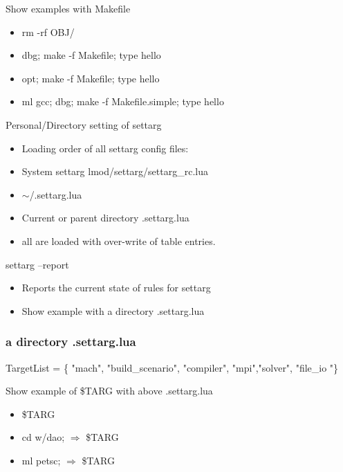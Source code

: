 \documentclass{beamer}
\begin{document}
\begin{frame}{Show examples with Makefile }
  \begin{itemize}
    \item rm -rf OBJ/
    \item dbg; make -f Makefile; type hello
    \item opt; make -f Makefile; type hello
    \item ml gcc; dbg; make -f Makefile.simple; type hello
  \end{itemize}
\end{frame}

\begin{frame}{Personal/Directory setting of settarg}
  \begin{itemize}
    \item Loading order of all settarg config files:
    \item System settarg lmod/settarg/settarg\_rc.lua
    \item $\sim$/.settarg.lua
    \item Current or parent directory .settarg.lua
    \item all are loaded with over-write of table entries.
  \end{itemize}
\end{frame}

\begin{frame}{settarg --report}
  \begin{itemize}
    \item Reports the current state of rules for settarg
    \item Show example with a directory .settarg.lua
  \end{itemize}
\end{frame}

\begin{frame}[fragile]
  \frametitle{a directory .settarg.lua}
    {\small
\begin{semiverbatim}
TargetList  = \{ "mach", "build\_scenario", "compiler", 
                   "mpi","solver", "file\_io "\}
\end{semiverbatim}
    }
\end{frame}

\begin{frame}{Show example of \$TARG with above .settarg.lua}
  \begin{itemize}
    \item \$TARG 
    \item cd w/dao; $\Rightarrow$ \$TARG
    \item ml petsc; $\Rightarrow$ \$TARG
  \end{itemize}
\end{frame}
\end{document}
